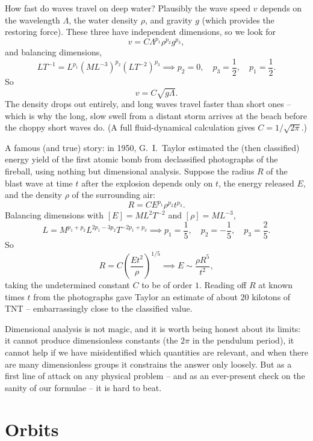 \begin{example}
	How fast do waves travel on deep water? Plausibly the wave speed $v$ depends on the wavelength $\Lambda$, the water density $\rho$, and gravity $g$ (which provides the restoring force). These three have independent dimensions, so we look for
	$$
	v = C \Lambda^{p_1} \rho^{p_2} g^{p_3},
	$$
	and balancing dimensions,
	$$
	LT^{-1} = L^{p_1} (ML^{-3})^{p_2} (LT^{-2})^{p_3} \implies p_2 = 0, \quad p_3 = \frac{1}{2}, \quad p_1 = \frac{1}{2}.
	$$
	So
	$$
	v = C\sqrt{g \Lambda}.
	$$
	The density drops out entirely, and long waves travel faster than short ones -- which is why the long, slow swell from a distant storm arrives at the beach before the choppy short waves do. (A full fluid-dynamical calculation gives $C = 1/\sqrt{2\pi}$.)
\end{example}

\begin{example}
	A famous (and true) story: in 1950, G.\ I.\ Taylor estimated the (then classified) energy yield of the first atomic bomb from declassified photographs of the fireball, using nothing but dimensional analysis. Suppose the radius $R$ of the blast wave at time $t$ after the explosion depends only on $t$, the energy released $E$, and the density $\rho$ of the surrounding air:
	$$
	R = C E^{p_1} \rho^{p_2} t^{p_3}.
	$$
	Balancing dimensions with $[E] = ML^2T^{-2}$ and $[\rho] = ML^{-3}$,
	$$
	L = M^{p_1 + p_2} L^{2p_1 - 3p_2} T^{-2p_1 + p_3} \implies p_1 = \frac{1}{5}, \quad p_2 = -\frac{1}{5}, \quad p_3 = \frac{2}{5}.
	$$
	So
	$$
	R = C\left(\frac{E t^2}{\rho}\right)^{1/5} \implies E \sim \frac{\rho R^5}{t^2},
	$$
	taking the undetermined constant $C$ to be of order $1$. Reading off $R$ at known times $t$ from the photographs gave Taylor an estimate of about $20$ kilotons of TNT -- embarrassingly close to the classified value.
\end{example}

Dimensional analysis is not magic, and it is worth being honest about its limits: it cannot produce dimensionless constants (the $2\pi$ in the pendulum period), it cannot help if we have misidentified which quantities are relevant, and when there are many dimensionless groups it constrains the answer only loosely. But as a first line of attack on any physical problem -- and as an ever-present check on the sanity of our formulae -- it is hard to beat.




\section{Orbits}

